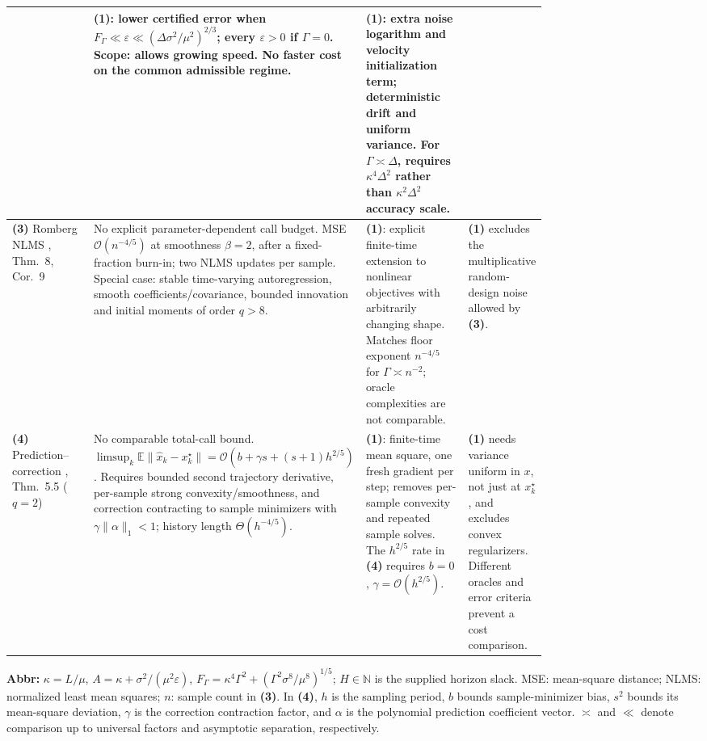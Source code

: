 \begin{table}[tp]
\begin{threeparttable}
\begin{tabularx}{\linewidth}{@{}>{\raggedright\arraybackslash}p{0.20\linewidth}>{\raggedright\arraybackslash}p{0.32\linewidth}>{\raggedright\arraybackslash}p{0.25\linewidth}>{\raggedright\arraybackslash}X@{}}
& \textbf{(1)}: lower certified error when $F_\Gamma\ll\varepsilon\ll(\Delta\sigma^2/\mu^2)^{2/3}$; every $\varepsilon>0$ if $\Gamma=0$. Scope: allows growing speed. No faster cost on the common admissible regime.
& \textbf{(1)}: extra noise logarithm and velocity initialization term; deterministic drift and uniform variance. For $\Gamma\asymp\Delta$, requires $\kappa^4\Delta^2$ rather than $\kappa^2\Delta^2$ accuracy scale. \\
\midrule
\textbf{(3)} Romberg NLMS \citep{sdscMoulines2005}, Thm.~8, Cor.~9
& No explicit parameter-dependent call budget. MSE $\mathcal{O}(n^{-4/5})$ at smoothness $\beta=2$, after a fixed-fraction burn-in; two NLMS updates per sample. Special case: stable time-varying autoregression, smooth coefficients/covariance, bounded innovation and initial moments of order $q>8$.
& \textbf{(1)}: explicit finite-time extension to nonlinear objectives with arbitrarily changing shape. Matches floor exponent $n^{-4/5}$ for $\Gamma\asymp n^{-2}$; oracle complexities are not comparable.
& \textbf{(1)} excludes the multiplicative random-design noise allowed by \textbf{(3)}. \\
\midrule
\textbf{(4)} Prediction--correction \citep{sdscKamijima2025v1}, Thm.~5.5 ($q=2$)
& No comparable total-call bound. $\limsup_k\mathbb E\|\hat x_k-x_k^\star\|=\mathcal{O}\!\left(b+\gamma s+(s+1)h^{2/5}\right)$. Requires bounded second trajectory derivative, per-sample strong convexity/smoothness, and correction contracting to sample minimizers with $\gamma\|\alpha\|_1<1$; history length $\Theta(h^{-4/5})$.
& \textbf{(1)}: finite-time mean square, one fresh gradient per step; removes per-sample convexity and repeated sample solves. The $h^{2/5}$ rate in \textbf{(4)} requires $b=0$, $\gamma=\mathcal{O}(h^{2/5})$.
& \textbf{(1)} needs variance uniform in $x$, not just at $x_k^\star$, and excludes convex regularizers. Different oracles and error criteria prevent a cost comparison. \\
\bottomrule
\end{tabularx}
\begin{tablenotes}[flushleft]\footnotesize
\item[] \textbf{Abbr:} $\kappa=L/\mu$, $A=\kappa+\sigma^2/(\mu^2\varepsilon)$, $F_\Gamma=\kappa^4\Gamma^2+(\Gamma^2\sigma^8/\mu^8)^{1/5}$; $H\in\mathbb N$ is the supplied horizon slack. MSE: mean-square distance; NLMS: normalized least mean squares; $n$: sample count in \textbf{(3)}. In \textbf{(4)}, $h$ is the sampling period, $b$ bounds sample-minimizer bias, $s^2$ bounds its mean-square deviation, $\gamma$ is the correction contraction factor, and $\alpha$ is the polynomial prediction coefficient vector. $\asymp$ and $\ll$ denote comparison up to universal factors and asymptotic separation, respectively.
\end{tablenotes}
\end{threeparttable}
\end{table}
\clearpage
